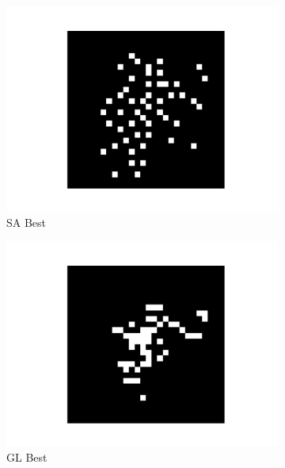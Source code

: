 \documentclass[a4paper,twocolumn]{article} %
\begin{document}
\begin{figure}[h!]
    \vspace{1em}

    \begin{subfigure}[t]{0.23\linewidth}
        \includegraphics[width=\linewidth]{figures/best_seed_sa.pdf}
        \caption*{SA Best}
    \end{subfigure}
    \hfill
    \begin{subfigure}[t]{0.23\linewidth}
        \includegraphics[width=\linewidth]{figures/best_seed_gl.pdf}
        \caption*{GL Best}
    \end{subfigure}
    \hfill
    \begin{subfigure}[t]{0.23\linewidth}

\end{subfigure}
\end{figure}
\end{document}
